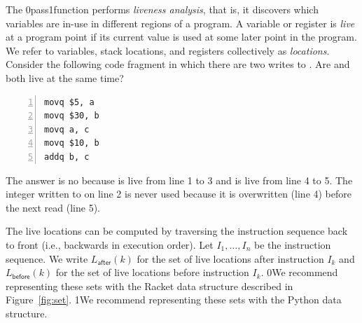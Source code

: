 \documentclass[7x10]{TimesAPriori_MIT}%
\def\racketEd{0}
\def\pythonEd{1}
\def\edition{1}
\newcommand{\racket}[1]{{\if\edition\racketEd{#1}\fi}}
\newcommand{\python}[1]{{\if\edition\pythonEd #1\fi}}
\begin{document}
The  \racket{pass}\python{function}
performs \emph{liveness analysis}, that
is, it discovers which variables are in-use in different regions of a
program.
%
A variable or register is \emph{live} at a program point if its
current value is used at some later point in the program.  We refer to
variables, stack locations, and registers collectively as
\emph{locations}.
%
Consider the following code fragment in which there are two writes to
. Are  and  both live at the same time?
\begin{center}
  \begin{minipage}{0.96\textwidth}
\begin{lstlisting}[numbers=left,numberstyle=\tiny]
movq $5, a
movq $30, b
movq a, c
movq $10, b
addq b, c
\end{lstlisting}
\end{minipage}
\end{center}
The answer is no because  is live from line 1 to 3 and
 is live from line 4 to 5.  The integer written to  on
line 2 is never used because it is overwritten (line 4) before the
next read (line 5).

The live locations can be computed by traversing the instruction
sequence back to front (i.e., backwards in execution order).  Let
$I_1,\ldots, I_n$ be the instruction sequence. We write
$L_{\mathsf{after}}(k)$ for the set of live locations after
instruction $I_k$ and $L_{\mathsf{before}}(k)$ for the set of live
locations before instruction $I_k$.
\racket{We recommend representing these
sets with the Racket  data structure described in
Figure~\ref{fig:set}.}
\python{We recommend representing these sets with the Python
  \href{https://docs.python.org/3.10/library/stdtypes.html\#set-types-set-frozenset}{\code{set}}
data structure.}
\end{document}
